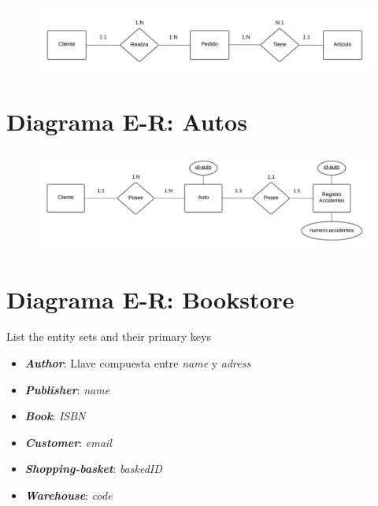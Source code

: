 \documentclass[letterpaper, 12pt]{report}
\newcommand{\bolditalic}[1]{\textbf{\textit{#1}}}
\begin{document}
\begin{figure}[H]
	\begin{center}
		\includegraphics[width=\linewidth]{./Images/Punto_3.png}
	\end{center}
\end{figure}

\section{Diagrama E\@{}-\@{}R:\@{} Autos}

\begin{figure}[H]
	\begin{center}
		\includegraphics[width=\linewidth]{./Images/Punto_4.png}
	\end{center}
\end{figure}

\section{Diagrama E\@{}-\@{}R:\@{} Bookstore}

List the entity sets and their primary keys

\begin{itemize}[label=$\triangleright$]
	\item \bolditalic{Author}: Llave compuesta entre \textit{name} y \textit{adress}
	\item \bolditalic{Publisher}: \textit{name}
	\item \bolditalic{Book}: \textit{ISBN}
	\item \bolditalic{Customer}: \textit{email}
	\item \bolditalic{Shopping-basket}: \textit{baskedID}
	\item \bolditalic{Warehouse}: \textit{code}
\end{itemize}

\printbibliography
\end{document}
